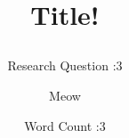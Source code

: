\documentclass{article}
\title{Title!
\subtitle{Research Question :3}}
\author{Meow}
\date{Word Count :3}
\numberwithin{equation}{section}
\numberwithin{figure}{section}
\begin{document}
\clearpage\maketitle
\thispagestyle{empty}
\newpage

\tableofcontents
\newpage

\renewcommand{\thesection}{Section \Alph{section}}
\renewcommand{\thefigure}{\Alph{section}.\roman{figure}}

\pagestyle{fancy}
\fancyhf{}
\fancyhead[R]{\thepage}

\section{}


\section{}


\section{} 


\printbibliography
\end{document}
